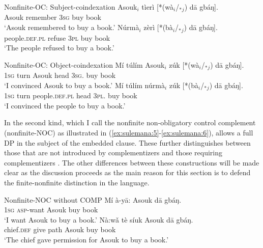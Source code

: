 \documentclass[output=paper,colorlinks,citecolor=brown]{langscibook}
\begin{document}
\ea%
    \label{ex:sulemana:3}
    Nonfinite-OC: Subject-coindexation
    \ea%
    \label{ex:sulemana:3a}
    \gll    Asouk$_i$ tìerì [*(wà$_i$/$_*${}$_j$) dā gbáŋ]. \\
            Asouk remember \textsc{3sg} buy book\\
    \glt    `Asouk remembered to buy a book.'
    \ex%
    \label{ex:sulemana:3b}
    \gll    Núrmà$_i$  zèrì [*(bà$_i$/$_*${}$_j$) dā gbáŋ]. \\
            people.\textsc{def.pl} refuse \textsc{3pl} buy book\\
    \glt    `The people refused to buy a book.'
    \z
\z

\ea%
    \label{ex:sulemana:4}
    Nonfinite-OC: Object-coindexation
    \ea%
    \label{ex:sulemana:4a}
    \gll    Mí túlím Asouk$_i$ zúk [*(wà$_i$/$_*${}$_j$) dā gbáŋ]. \\
            \textsc{1sg} turn Asouk head \textsc{3sg}. buy book\\
    \glt    `I convinced Asouk to buy a book.'
    \ex%
    \label{ex:sulemana:4b}
    \gll    Mí túlím núrmà$_i$ zúk [*(bà$_i$/$_*${}$_j$) dā gbáŋ]. \\
            \textsc{1sg} turn people.\textsc{def.pl} head \textsc{3pl}. buy book\\
    \glt    `I convinced the people to buy a book.' 
    \z
\z

In the second kind, which I call the nonfinite non-obligatory control complement (nonfinite-NOC) as illustrated in (\ref{ex:sulemana:5}-\ref{ex:sulemana:6}),  allows a full DP in the subject of the embedded clause. These further distinguishes between those that are not introduced by complementizers  and those requiring complementizers . The other differences between these constructions will be made clear as the discussion proceeds as the main  reason for this section is to defend the finite-nonfinite distinction in the language. 

\ea%
    \label{ex:sulemana:5}
    Nonfinite-NOC without COMP
    \ea%
    \label{ex:sulemana:5a}
    \gll    Mí à-yā: Asouk dā gbáŋ.\\
            \textsc{1sg} \textsc{asp}-want Asouk buy book\\
    \glt    `I want Asouk to buy a book.' 
    \ex%
    \label{ex:sulemana:5b}
    \gll    Nà:wǎ tè síuk Asouk dā gbáŋ. \\
            chief.\textsc{def} give path Asouk buy book\\
    \glt    `The chief gave permission for Asouk to buy a book.' 
    \z
\z
\end{document}

